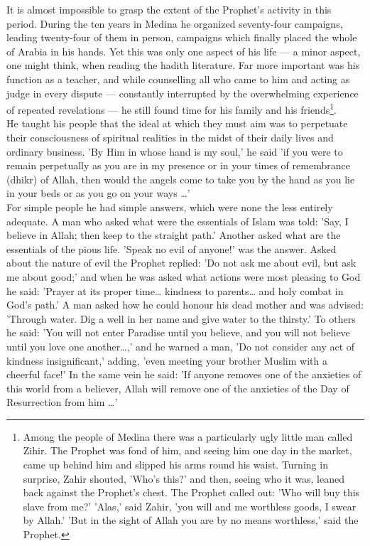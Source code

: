 \documentclass[10pt, twoside,openright]{book}
\begin{document}
It is almost impossible to grasp the extent of the Prophet's activity in this period. During the ten 
years in Medina he organized seventy\hyp{}four campaigns, leading twenty\hyp{}four of them in person, campaigns 
which finally placed the whole of Arabia in his hands. Yet this was only one aspect of his life --- a 
minor aspect, one might think, when reading the hadith literature. Far more important was his 
function as a teacher, and while counselling all who came to him and acting as judge in every dispute 
--- constantly interrupted by the overwhelming experience of repeated revelations --- he still found time 
for his family and his friends\footnote{Among the people of Medina there was a particularly ugly little man called Zihir. The Prophet was fond of him, and seeing him one day in the market, came up behind him and slipped his arms round his waist. Turning in surprise, Zahir shouted, 'Who's this?' and then, seeing who it was, leaned back against the Prophet's chest. The Prophet called out: 'Who will buy this slave from me?' 'Alas,' said Zahir, 'you will and me worthless goods, I swear by Allah.' 'But in the sight of Allah you are by no means worthless,' said the Prophet.}. \\

He taught his people that the ideal at which they must aim was to perpetuate their consciousness of 
spiritual realities in the midst of their daily lives and ordinary business. 'By Him in whose hand is 
my soul,' he said 'if you were to remain perpetually as you are in my presence or in your times of 
remembrance (dhikr) of Allah, then would the angels come to take you by the hand as you lie in your 
beds or as you go on your ways \ldots{}' \\

For simple people he had simple answers, which were none the less entirely adequate. A man who asked 
what were the essentials of Islam was told: 'Say, I believe in Allah; then keep to the straight 
path.' Another asked what are the essentials of the pious life. 'Speak no evil of anyone!' was the 
answer. Asked about the nature of evil the Prophet replied: 'Do not ask me about evil, but ask me 
about good;' and when he was asked what actions were most pleasing to God he said: 'Prayer at its 
proper time\ldots{} kindness to parents\ldots{} and holy combat in God's path.' A man asked how he could honour his dead mother and was advised: 'Through water. Dig a well in her name and give water to the thirsty.' To others he said: 'You will not enter Paradise until you believe, and you will not believe 
until you love one another\ldots{},' and he warned a man, 'Do not consider any act of kindness 
insignificant,' adding, 'even meeting your brother Muslim with a cheerful face!' In the same vein he 
said: 'If anyone removes one of the anxieties of this world from a believer, Allah will remove one of 
the anxieties of the Day of Resurrection from him \ldots{}' \\
\end{document}
